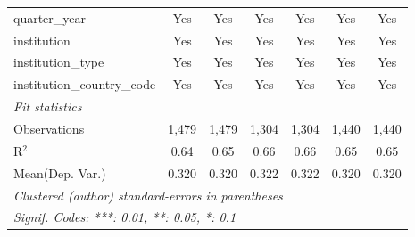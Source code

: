 \begin{tabular}{lcccccc}
   quarter\_year                      & Yes     & Yes     & Yes     & Yes     & Yes     & Yes\\  
   institution                        & Yes     & Yes     & Yes     & Yes     & Yes     & Yes\\  
   institution\_type                  & Yes     & Yes     & Yes     & Yes     & Yes     & Yes\\  
   institution\_country\_code         & Yes     & Yes     & Yes     & Yes     & Yes     & Yes\\  
   \midrule
   \emph{Fit statistics}\\
   Observations                       & 1,479   & 1,479   & 1,304   & 1,304   & 1,440   & 1,440\\  
   R$^2$                              & 0.64    & 0.65    & 0.66    & 0.66    & 0.65    & 0.65\\  
Mean(Dep. Var.) & 0.320 & 0.320 & 0.322 & 0.322 & 0.320 & 0.320 \\
   \midrule \midrule
   \multicolumn{7}{l}{\emph{Clustered (author) standard-errors in parentheses}}\\
   \multicolumn{7}{l}{\emph{Signif. Codes: ***: 0.01, **: 0.05, *: 0.1}}\\
\end{tabular}
\par\endgroup
